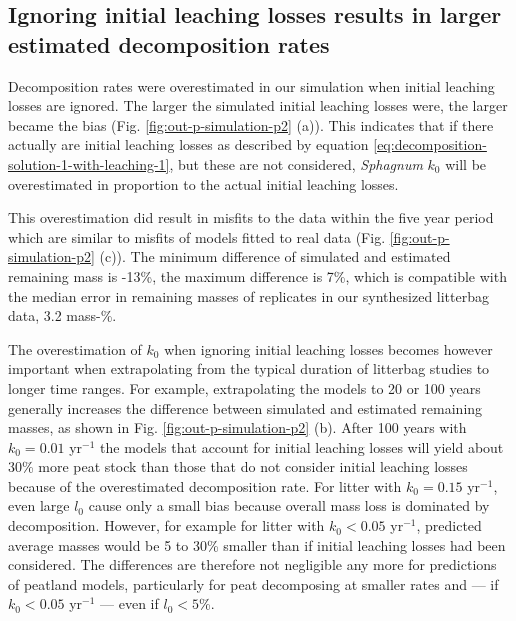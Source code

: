 \documentclass[
  12pt,
]{article}
\begin{document}
\hypertarget{out-res-2}{%
\subsection{Ignoring initial leaching losses results in larger estimated decomposition rates}\label{out-res-2}}

Decomposition rates were overestimated in our simulation when initial leaching losses are ignored. The larger the simulated initial leaching losses were, the larger became the bias (Fig. \ref{fig:out-p-simulation-p2} (a)). This indicates that if there actually are initial leaching losses as described by equation \eqref{eq:decomposition-solution-1-with-leaching-1}, but these are not considered, \emph{Sphagnum} \(k_0\) will be overestimated in proportion to the actual initial leaching losses.

This overestimation did result in misfits to the data within the five year period which are similar to misfits of models fitted to real data (Fig. \ref{fig:out-p-simulation-p2} (c)). The minimum difference of simulated and estimated remaining mass is -13\%, the maximum difference is 7\%, which is compatible with the median error in remaining masses of replicates in our synthesized litterbag data, 3.2 mass-\%.

The overestimation of \(k_0\) when ignoring initial leaching losses becomes however important when extrapolating from the typical duration of litterbag studies to longer time ranges. For example, extrapolating the models to 20 or 100 years generally increases the difference between simulated and estimated remaining masses, as shown in Fig. \ref{fig:out-p-simulation-p2} (b). After 100 years with \(k_0 = 0.01\) yr\(^{-1}\) the models that account for initial leaching losses will yield about 30\% more peat stock than those that do not consider initial leaching losses because of the overestimated decomposition rate. For litter with \(k_0 = 0.15\) yr\(^{-1}\), even large \(l_0\) cause only a small bias because overall mass loss is dominated by decomposition. However, for example for litter with \(k_0<0.05\) yr\(^{-1}\), predicted average masses would be 5 to 30\% smaller than if initial leaching losses had been considered. The differences are therefore not negligible any more for predictions of peatland models, particularly for peat decomposing at smaller rates and --- if \(k_0<0.05\) yr\(^{-1}\) --- even if \(l_0<5\)\%.
\end{document}
